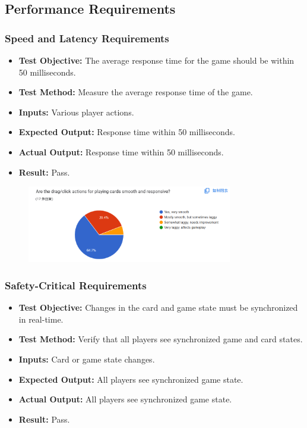 \documentclass[12pt, titlepage]{article}
\begin{document}
\subsection{Performance Requirements}

\subsubsection{Speed and Latency Requirements}
\begin{itemize}
    \item \textbf{Test Objective:} The average response time for the game should be within 50 milliseconds.
    \item \textbf{Test Method:} Measure the average response time of the game.
    \item \textbf{Inputs:} Various player actions.
    \item \textbf{Expected Output:} Response time within 50 milliseconds.
    \item \textbf{Actual Output:} Response time within 50 milliseconds.
    \item \textbf{Result:} Pass.
\end{itemize}

\begin{figure}[h!]
    \centering
    \includegraphics[width=0.8\textwidth]{image3.png}
    \caption{}
    \label{fig:labelname}
\end{figure}

\subsubsection{Safety-Critical Requirements}
\begin{itemize}
    \item \textbf{Test Objective:} Changes in the card and game state must be synchronized in real-time.
    \item \textbf{Test Method:} Verify that all players see synchronized game and card states.
    \item \textbf{Inputs:} Card or game state changes.
    \item \textbf{Expected Output:} All players see synchronized game state.
    \item \textbf{Actual Output:} All players see synchronized game state.
    \item \textbf{Result:} Pass.
\end{itemize}
\end{document}
